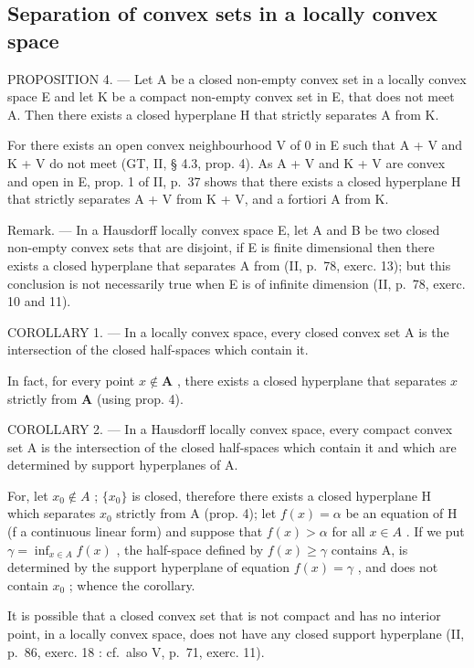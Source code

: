 \subsection{Separation of convex sets in a locally convex space}

PROPOSITION 4. --- Let A be a closed non-empty convex set in a locally convex space E and let K be a compact non-empty convex set in E, that does not meet A. Then there exists a closed hyperplane H that strictly separates A from K.

For there exists an open convex neighbourhood V of 0 in E such that A + V and K + V do not meet (GT, II, § 4.3, prop. 4). As A + V and K + V are convex and open in E, prop. 1 of II, p.~37 shows that there exists a closed hyperplane H that strictly separates A + V from K + V, and a fortiori A from K.

Remark. --- In a Hausdorff locally convex space E, let A and B be two closed non-empty convex sets that are disjoint, if E is finite dimensional then there exists a closed hyperplane that separates A from (II, p.~78, exerc. 13); but this conclusion is not necessarily true when E is of infinite dimension (II, p.~78, exerc. 10 and 11).

COROLLARY 1. --- In a locally convex space, every closed convex set A is the intersection of the closed half-spaces which contain it.

In fact, for every point \(x \notin \mathbf{A}\) , there exists a closed hyperplane that separates \(x\) strictly from \(\mathbf{A}\) (using prop. 4).

COROLLARY 2. --- In a Hausdorff locally convex space, every compact convex set A is the intersection of the closed half-spaces which contain it and which are determined by support hyperplanes of A.

For, let \(x_{0} \notin A\) ; \(\{x_{0}\}\) is closed, therefore there exists a closed hyperplane H which separates \(x_{0}\) strictly from A (prop. 4); let \(f(x) = \alpha\) be an equation of H (f a continuous linear form) and suppose that \(f(x) > \alpha\) for all \(x \in A\) . If we put \(\gamma = \inf_{x \in A} f(x)\) , the half-space defined by \(f(x) \geqslant \gamma\) contains A, is determined by the support hyperplane of equation \(f(x) = \gamma\) , and does not contain \(x_{0}\) ; whence the corollary.

It is possible that a closed convex set that is not compact and has no interior point, in a locally convex space, does not have any closed support hyperplane (II, p.~86, exerc. 18 : cf.~also V, p.~71, exerc. 11).


